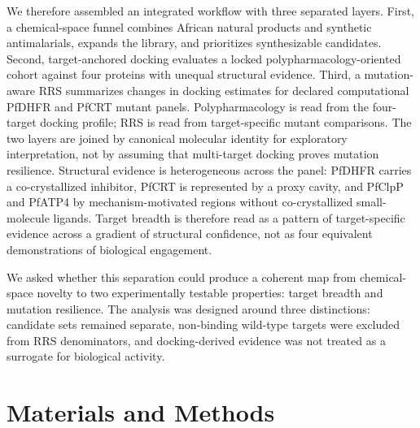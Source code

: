 \documentclass[journal=jcisd8,manuscript=article]{achemso}
\begin{document}
We therefore assembled an integrated workflow with three separated layers. First, a chemical-space funnel combines African natural products and synthetic antimalarials, expands the library, and prioritizes synthesizable candidates. Second, target-anchored docking evaluates a locked polypharmacology-oriented cohort against four proteins with unequal structural evidence. Third, a mutation-aware RRS summarizes changes in docking estimates for declared computational PfDHFR and PfCRT mutant panels. Polypharmacology is read from the four-target docking profile; RRS is read from target-specific mutant comparisons. The two layers are joined by canonical molecular identity for exploratory interpretation, not by assuming that multi-target docking proves mutation resilience. Structural evidence is heterogeneous across the panel: PfDHFR carries a co-crystallized inhibitor, PfCRT is represented by a proxy cavity, and PfClpP and PfATP4 by mechanism-motivated regions without co-crystallized small-molecule ligands. Target breadth is therefore read as a pattern of target-specific evidence across a gradient of structural confidence, not as four equivalent demonstrations of biological engagement.

We asked whether this separation could produce a coherent map from chemical-space novelty to two experimentally testable properties: target breadth and mutation resilience. The analysis was designed around three distinctions: candidate sets remained separate, non-binding wild-type targets were excluded from RRS denominators, and docking-derived evidence was not treated as a surrogate for biological activity.

\section{Materials and Methods}\label{sec:methods}
\end{document}
